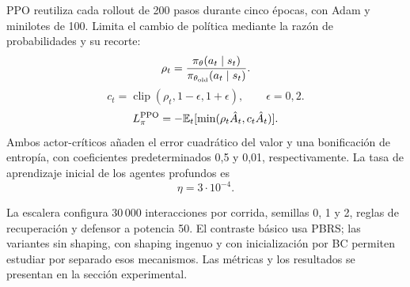PPO \cite{schulman2017} reutiliza cada rollout de 200 pasos durante cinco épocas,
con Adam y minilotes de 100. Limita el cambio de política mediante la razón de
probabilidades y su recorte:
\[
    \rho_t=\frac{\pi_\theta(a_t\mid s_t)}{\pi_{\theta_{\rm old}}(a_t\mid s_t)}.
\]
\[
    c_t=\operatorname{clip}(\rho_t,1-\epsilon,1+\epsilon),\qquad\epsilon=0{,}2.
\]
\[
    L_\pi^{\rm PPO}=-\mathbb{E}_t[\min(\rho_t\hat A_t,c_t\hat A_t)].
\]
Ambos actor-críticos añaden el error cuadrático del valor y una bonificación de
entropía, con coeficientes predeterminados 0,5 y 0,01, respectivamente. La tasa
de aprendizaje inicial de los agentes profundos es
\[
    \eta=3\cdot10^{-4}.
\]

La escalera configura 30\,000 interacciones por corrida, semillas 0, 1 y 2,
reglas de recuperación y defensor a potencia 50. El contraste básico usa PBRS;
las variantes sin shaping, con shaping ingenuo y con inicialización por BC
permiten estudiar por separado esos mecanismos. Las métricas y los resultados
se presentan en la sección experimental.
